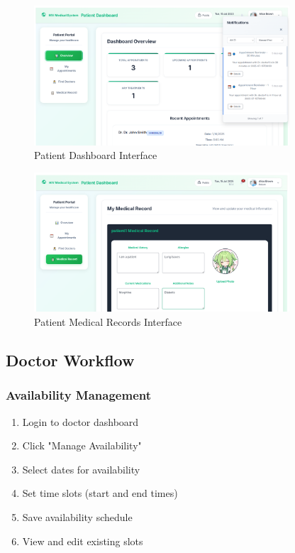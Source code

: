 \documentclass[12pt,a4paper]{article}
\begin{document}
\begin{figure}[H]
\centering
\includegraphics[width=0.85\textwidth]{patient_dashboard.png}
\caption{Patient Dashboard Interface}
\label{fig:patient-dashboard}
\end{figure}

\begin{figure}[H]
\centering
\includegraphics[width=0.85\textwidth]{patient_records.png}
\caption{Patient Medical Records Interface}
\label{fig:patient-records}
\end{figure}

\subsection{Doctor Workflow}

\subsubsection{Availability Management}

\begin{enumerate}
    \item Login to doctor dashboard
    \item Click "Manage Availability"
    \item Select dates for availability
    \item Set time slots (start and end times)
    \item Save availability schedule
    \item View and edit existing slots
\end{enumerate}
\end{document}

